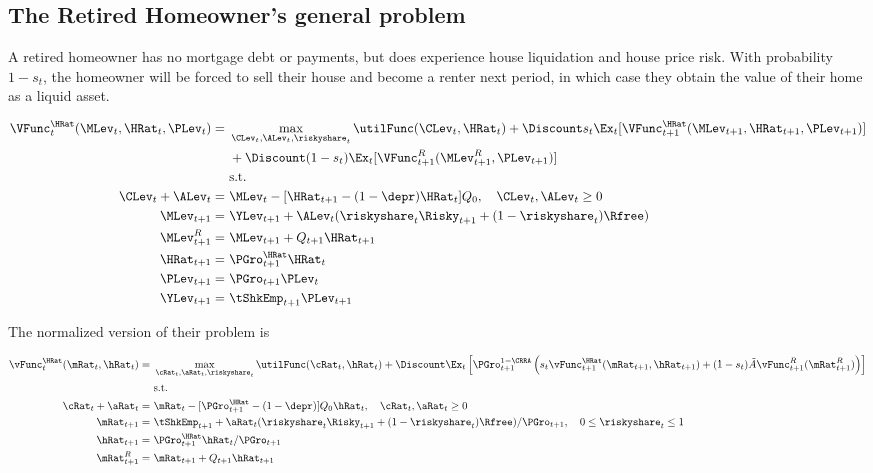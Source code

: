 \documentclass[PortfolioChoiceWithRiskyHousing]{subfiles}
\begin{document}
\subsection{The Retired Homeowner's general problem}

A retired homeowner has no mortgage debt or payments, but does experience house liquidation and house price risk. With probability $1-s_{t}$, the homeowner will be forced to sell their house and become a renter next period, in which case they obtain the value of their home as a liquid asset.

\begin{equation}
	\begin{split}
		\VFunc_{t}^{\HRat}(\MLev_{t}, \HRat_{t}, \PLev_{t}) = &~ \max_{\CLev_{t}, \ALev_{t}, \riskyshare_{t}} \utilFunc(\CLev_{t}, \HRat_{t}) + \Discount s_{t} \Ex_{t} [\VFunc_{t+1}^{\HRat}(\MLev_{t+1}, \HRat_{t+1}, \PLev_{t+1})] \\
		&~ + \Discount (1-s_{t}) \Ex_{t} [\VFunc_{t+1}^R(\MLev^R_{t+1}, \PLev_{t+1})] \\
		&~ \text{s.t.} \\
		\CLev_{t} + \ALev_{t} = &~ \MLev_{t} - [\HRat_{t+1} - (1-\depr)\HRat_{t} ]Q_{0}, \quad \CLev_{t} , \ALev_{t}\ge 0 \\
		\MLev_{t+1} = &~ \YLev_{t+1} + \ALev_{t}(\riskyshare_{t}\Risky_{t+1} + (1-\riskyshare_{t})\Rfree)\\
		\MLev^R_{t+1} = &~ \MLev_{t+1} + Q_{t+1}\HRat_{t+1} \\
		\HRat_{t+1} = &~ \PGro^{\HRat}_{t+1} \HRat_{t}\\
		\PLev_{t+1} = &~ \PGro_{t+1} \PLev_{t} \\
		\YLev_{t+1} = &~ \tShkEmp_{t+1}\PLev_{t+1}
	\end{split}
\end{equation}

The normalized version of their problem is

\begin{equation}
	\begin{split}
		\vFunc^{\HRat}_{t}(\mRat_{t}, \hRat_{t}) = &~ \max_{\cRat_{t}, \aRat_{t}, \riskyshare_{t}} \utilFunc(\cRat_{t}, \hRat_{t}) + \Discount\Ex_{t} \left[ \PGro_{t+1}^{1-\CRRA} \left(s_{t} \vFunc^{\HRat}_{t+1}(\mRat_{t+1}, \hRat_{t+1}) + (1-s_{t}) \tilde{A} \vFunc^R_{t+1}(\mRat^R_{t+1})\right)\right] \\
		&~ \text{s.t.} \\
		\cRat_{t} + \aRat_{t} = &~ \mRat_{t} -[\PGro^{\HRat}_{t+1} - (1-\depr) ] Q_{0} \hRat_{t}, \quad \cRat_{t}, \aRat_{t} \ge 0 \\
		\mRat_{t+1} = &~ \tShkEmp_{t+1} + \aRat_{t}(\riskyshare_{t}\Risky_{t+1} + (1-\riskyshare_{t})\Rfree)/\PGro_{t+1}, \quad 0 \le \riskyshare_{t} \le 1 \\
		\hRat_{t+1} = &~ \PGro^{\HRat}_{t+1} \hRat_{t} / \PGro_{t+1} \\
		\mRat^R_{t+1} = &~ \mRat_{t+1} + Q_{t+1}\hRat_{t+1}
	\end{split}
\end{equation}
\end{document}

